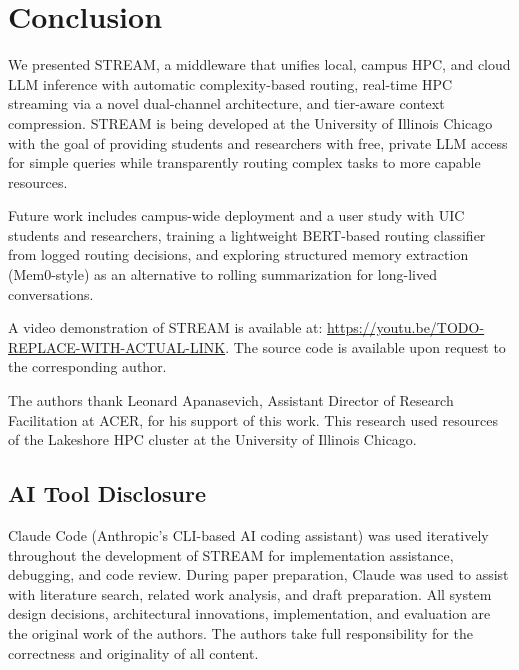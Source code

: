 \documentclass[manuscript, review]{acmart}
\begin{document}
\section{Conclusion}

We presented STREAM, a middleware that unifies local, campus HPC, and cloud LLM inference with automatic complexity-based routing, real-time HPC streaming via a novel dual-channel architecture, and tier-aware context compression. STREAM is being developed at the University of Illinois Chicago with the goal of providing students and researchers with free, private LLM access for simple queries while transparently routing complex tasks to more capable resources.


Future work includes campus-wide deployment and a user study with UIC students and researchers, training a lightweight BERT-based routing classifier from logged routing decisions, and exploring structured memory extraction (Mem0-style) as an alternative to rolling summarization for long-lived conversations.

A video demonstration of STREAM is available at: \url{https://youtu.be/TODO-REPLACE-WITH-ACTUAL-LINK}. The source code is available upon request to the corresponding author.

\begin{acks}
The authors thank Leonard Apanasevich, Assistant Director of Research Facilitation at ACER, for his support of this work. This research used resources of the Lakeshore HPC cluster at the University of Illinois Chicago.
\end{acks}

\subsection*{AI Tool Disclosure}
Claude Code (Anthropic's CLI-based AI coding assistant) was used iteratively throughout the development of STREAM for implementation assistance, debugging, and code review. During paper preparation, Claude was used to assist with literature search, related work analysis, and draft preparation. All system design decisions, architectural innovations, implementation, and evaluation are the original work of the authors. The authors take full responsibility for the correctness and originality of all content.

\end{document}
